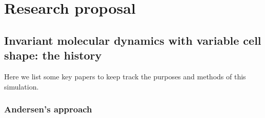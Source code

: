 
\section{Research proposal}

\subsection{Invariant molecular dynamics with variable cell shape: the history}

Here we list some key papers to keep track the purposes and methods of this
simulation.

\subsubsection{Andersen's approach}

